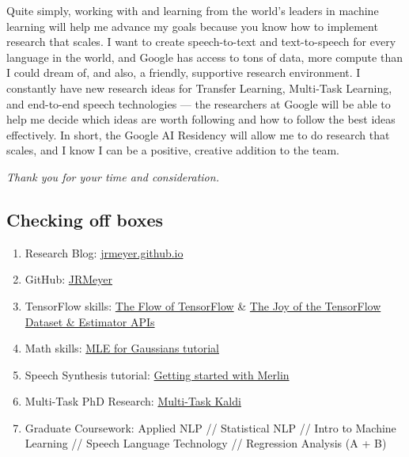 \documentclass[12pt,a4paper]{article}
\begin{document}
Quite simply, working with and learning from the world's leaders in machine learning will help me advance my goals because you know how to implement research that scales. I want to create speech-to-text and text-to-speech for every language in the world, and Google has access to tons of data, more compute than I could dream of, and also, a friendly, supportive research environment. I constantly have new research ideas for Transfer Learning, Multi-Task Learning, and end-to-end speech technologies --- the researchers at Google will be able to help me decide which ideas are worth following and how to follow the best ideas effectively. In short, the Google AI Residency will allow me to do research that scales, and I know I can be a positive, creative addition to the team.

    
\begin{center}
\textit{Thank you for your time and consideration.}  
\end{center}



\newpage

\subsection*{Checking off boxes}

\begin{enumerate}

\item Research Blog: \href{http://jrmeyer.github.io}{jrmeyer.github.io}

\item GitHub: \href{https://github.com/JRMeyer}{JRMeyer}
  
\item TensorFlow skills: \href{http://jrmeyer.github.io/machinelearning/2016/02/01/TensorFlow-Tutorial.html}{The Flow of TensorFlow} \& \href{http://jrmeyer.github.io/machinelearning/2019/05/29/tensorflow-dataset-estimator-api.html}{The Joy of the TensorFlow Dataset \& Estimator APIs}
  
\item Math skills: \href{http://jrmeyer.github.io/machinelearning/2017/08/18/mle.html}{MLE for Gaussians tutorial}

\item Speech Synthesis tutorial: \href{http://jrmeyer.github.io/tts/2017/02/14/Installing-Merlin.html}{Getting started with Merlin}

\item Multi-Task PhD Research: \href{https://github.com/JRMeyer/multi-task-kaldi}{Multi-Task Kaldi}
  
\item Graduate Coursework: Applied NLP // Statistical NLP // Intro to Machine Learning // Speech Language Technology // Regression Analysis (A + B)

\end{enumerate}
\end{document}
